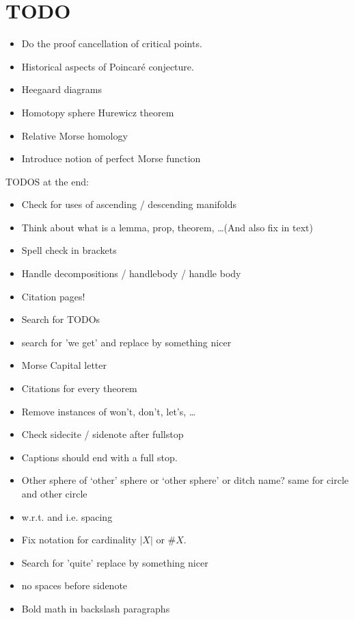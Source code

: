 \chapter*{TODO}
\begin{itemize}
    \item Do the proof cancellation of critical points.
    \item Historical aspects of Poincaré conjecture.
    \item Heegaard diagrams
    \item Homotopy sphere Hurewicz theorem
    \item Relative Morse homology
    \item Introduce notion of perfect Morse function
\end{itemize}


TODOS at the end:
\begin{itemize}
    \item Check for uses of ascending / descending manifolds
    \item Think about what is a lemma, prop, theorem, \ldots (And also fix in text)
    \item Spell check in brackets
    \item Handle decompositions / handlebody / handle body
    \item Citation pages!
    \item Search for TODOs
    \item search for 'we get' and replace by something nicer
    \item Morse Capital letter
    \item Citations for every theorem
    \item Remove instances of won't, don't, let's, \ldots
    \item Check sidecite / sidenote after fullstop
    \item Captions should end with a full stop.
    \item Other sphere of `other' sphere or `other sphere' or ditch name? same for circle and other circle
    \item w.r.t. and i.e. spacing
        \item Fix notation for cardinality $|X| $ or  $\# X$.
        \item Search for 'quite' replace by something nicer
        \item no spaces before sidenote
        \item Bold math in backslash paragraphs
\end{itemize}

